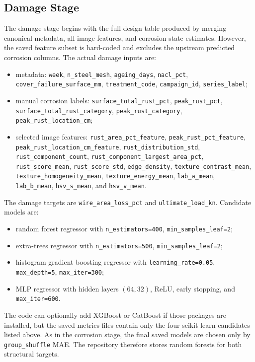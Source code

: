 \documentclass[11pt,a4paper]{article}
\begin{document}
\subsection{Damage Stage}

The damage stage begins with the full design table produced by merging canonical metadata, all image features, and corrosion-state estimates. However, the saved feature subset is hard-coded and excludes the upstream predicted corrosion columns. The actual damage inputs are:
\begin{itemize}
  \item metadata: \texttt{week}, \texttt{n\_steel\_mesh}, \texttt{ageing\_days}, \texttt{nacl\_pct}, \texttt{cover\_failure\_surface\_mm}, \texttt{treatment\_code}, \texttt{campaign\_id}, \texttt{series\_label};
  \item manual corrosion labels: \texttt{surface\_total\_rust\_pct}, \texttt{peak\_rust\_pct}, \texttt{surface\_total\_rust\_category}, \texttt{peak\_rust\_category}, \texttt{peak\_rust\_location\_cm};
  \item selected image features: \texttt{rust\_area\_pct\_feature}, \texttt{peak\_rust\_pct\_feature}, \texttt{peak\_rust\_location\_cm\_feature}, \texttt{rust\_distribution\_std}, \texttt{rust\_component\_count}, \texttt{rust\_component\_largest\_area\_pct}, \texttt{rust\_score\_mean}, \texttt{rust\_score\_std}, \texttt{edge\_density}, \texttt{texture\_contrast\_mean}, \texttt{texture\_homogeneity\_mean}, \texttt{texture\_energy\_mean}, \texttt{lab\_a\_mean}, \texttt{lab\_b\_mean}, \texttt{hsv\_s\_mean}, and \texttt{hsv\_v\_mean}.
\end{itemize}

The damage targets are \texttt{wire\_area\_loss\_pct} and \texttt{ultimate\_load\_kn}. Candidate models are:
\begin{itemize}
  \item random forest regressor with \texttt{n\_estimators=400}, \texttt{min\_samples\_leaf=2};
  \item extra-trees regressor with \texttt{n\_estimators=500}, \texttt{min\_samples\_leaf=2};
  \item histogram gradient boosting regressor with \texttt{learning\_rate=0.05}, \texttt{max\_depth=5}, \texttt{max\_iter=300};
  \item MLP regressor with hidden layers \((64,32)\), ReLU, early stopping, and \texttt{max\_iter=600}.
\end{itemize}

The code can optionally add XGBoost or CatBoost if those packages are installed, but the saved metrics files contain only the four scikit-learn candidates listed above. As in the corrosion stage, the final saved models are chosen only by \texttt{group\_shuffle} MAE. The repository therefore stores random forests for both structural targets.
\end{document}
